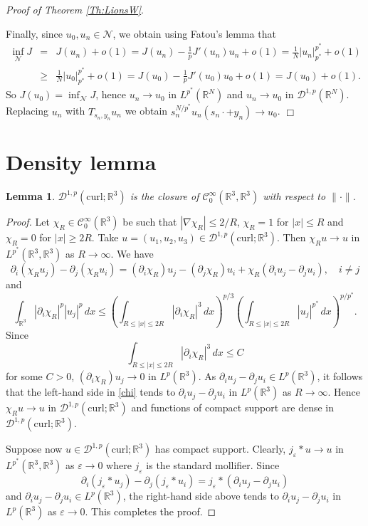 \documentclass[12pt,leqno,twoside]{amsart}
\newtheorem{Lem}[Th]{Lemma}
\newenvironment{altproof}[1]
{\noindent%
{\em Proof of {#1}}.}
{\nopagebreak\mbox{}\hfill $\Box$\par\addvspace{0.5cm}}
\newcommand{\eps}{\varepsilon}
\def\R{\mathbb{R}}
\def\curl{\mathrm{curl}}
\def\Wc{\mathscr{W}}
\newcommand{\cC}{{\mathcal C}}
\newcommand{\cD}{{\mathcal D}}
\newcommand{\cN}{{\mathcal N}}
\def\r{\mathbb{R}}
\def\r3{\mathbb{R}^3}
\def\Wc{\cD^{1,p}(\curl;\R^3)}
\def\eps{\varepsilon}
\def\ir3{\int_{\r3}}
\numberwithin{equation}{section}
\begin{document}
\begin{altproof}{Theorem \ref{Th:LionsW}}
	
	Finally, since $u_0, u_n\in\cN$, 
	we obtain using Fatou's lemma that
	\begin{eqnarray*}
		\inf_\cN J & = &  J(u_n)+o(1) = J(u_n)-\frac1p J'(u_n)u_n + o(1) = \frac1N|u_n|^{p^*}_{p^*} + o(1) \\
		& \ge & \frac1N|u_0|^{p^*}_{p^*} + o(1) = J(u_0)-\frac1pJ'(u_0)u_0+o(1)=J(u_0) + o(1).
	\end{eqnarray*}
	So $J(u_0)=\inf_\cN J$, hence  $u_n\to u_0$ in $L^{p^*}(\R^N)$ and $u_n\to u_0$ in $\cD^{1,p}(\R^N)$. Replacing $u_n$ with $T_{s_n,y_n}u_n$ we obtain $s_n^{N/p^*}u_n(s_n\cdot +y_n) \to u_0$.
\end{altproof}


\appendix




\section{Density lemma}\label{app:densisty}

\begin{Lem} \label{density}
$\Wc$ is the closure of $\cC^{\infty}_0(\R^3,\R^3)$ with respect to $\|\cdot\|$.
\end{Lem}

\begin{proof}
Let $\chi_R\in \cC_0^\infty(\R^3)$ be such that $|\nabla\chi_R|\le 2/R$, $\chi_R=1$ for $|x|\le R$ and $\chi_R= 0$ for $|x|\ge 2R$. Take $u=(u_1,u_2,u_3)\in \Wc$. Then $\chi_Ru\to u$ in $L^{p^*}(\R^3,\R^3)$ as $R\to\infty$. We have 
	\begin{equation} \label{chi}
		\partial_i(\chi_Ru_j)-\partial_j(\chi_Ru_i) = (\partial_i\chi_R)u_j - (\partial_j\chi_R)u_i + \chi_R(\partial_iu_j-\partial_ju_i),
		\quad i\ne j
	\end{equation}
	and
	\[
	\ir3|\partial_i\chi_R|^p|u_j|^p\,dx \le \left(\int_{R\le|x|\le 2R}|\partial_i\chi_R|^3\,dx\right)^{p/3}\left(\int_{R\le|x|\le 2R}|u_j|^{p^*}
	\,dx\right)^{p/p^*}.
	\]
	Since
	\[
	\int_{R\le|x|\le 2R}|\partial_i\chi_R|^3\,dx \le C
	\]
	for some $C>0$,
$(\partial_i\chi_R)u_j\to 0$ in $L^p(\r3)$. As $\partial_iu_j-\partial_ju_i\in L^p(\R^3)$, it follows that the left-hand side in \eqref{chi} tends to $\partial_iu_j-\partial_ju_i$ in $L^p(\R^3)$ as $R\to\infty$. 
	Hence $\chi_R u \to u$ in $\Wc$ and functions of compact support are dense in $\Wc$.
	
	Suppose now  $u\in \Wc$ has compact support. Clearly, $j_\eps*u\to u$ in $L^{p^*}(\R^3,\R^3)$ as $\eps\to 0$ where $j_\eps$ is the standard mollifier. Since
	\begin{equation*}
		\partial_i(j_\eps*u_j)-\partial_j(j_\eps*u_i) = j_\eps*(\partial_iu_j-\partial_ju_i)
	\end{equation*}
	and $\partial_iu_j-\partial_ju_i\in L^p(\R^3)$, the right-hand side above tends to $\partial_iu_j-\partial_ju_i$ in $L^p(\R^3)$ as $\eps\to 0$. This completes the proof.
\end{proof}
\end{document}
